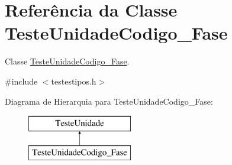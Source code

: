 \hypertarget{class_teste_unidade_codigo___fase}{
\section{\-Referência da \-Classe \-Teste\-Unidade\-Codigo\-\_\-\-Fase}
\label{class_teste_unidade_codigo___fase}
}


\-Classe \hyperlink{class_teste_unidade_codigo___fase}{\-Teste\-Unidade\-Codigo\-\_\-\-Fase}.  




{\ttfamily \#include $<$testestipos.\-h$>$}

\-Diagrama de \-Hierarquia para \-Teste\-Unidade\-Codigo\-\_\-\-Fase\-:\begin{figure}[H]
\begin{center}
\leavevmode
\includegraphics[height=2.000000cm]{class_teste_unidade_codigo___fase}
\end{center}
\end{figure}
